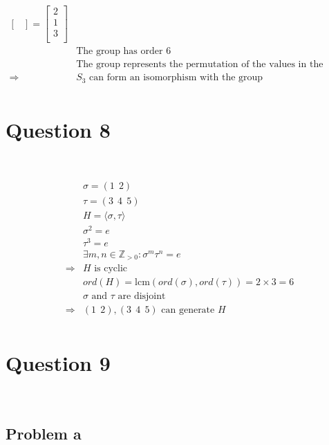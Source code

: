 \documentclass{article}
\begin{document}
\begin{equation*}
\begin{split}
\begin{bmatrix}
        \end{bmatrix}=\begin{bmatrix}
            2\\
            1\\
            3\\
        \end{bmatrix}\\
        &\text{The group has order }6\\
        &\text{The group represents the permutation of the values in the vector}\\
        \Rightarrow&S_3\text{ can form an isomorphism with the group}\\
    \end{split}
\end{equation*}

\newpage

\section*{Question 8}

~

\begin{equation*}
    \begin{split}
        &\sigma = (1\ \ 2)\\
        &\tau=(3\ \ 4\ \ 5)\\
        &H=\langle\sigma,\tau\rangle\\
        &\sigma^2=e\\
        &\tau^3=e\\
        &\exists m,n\in\mathbb{Z} _{>0}:\sigma^m\tau^n=e\\
        \Rightarrow&H\text{ is cyclic}\\
        &ord(H)=\mathrm{lcm}(ord(\sigma),ord(\tau))=2\times 3=6\\
        &\sigma\text{ and }\tau\text{ are disjoint}\\
        \Rightarrow&(1\ \ 2),(3\ \ 4\ \ 5)\text{ can generate } H\\
    \end{split}
\end{equation*}

\newpage

\section*{Question 9}

~

\subsection*{Problem a}
\end{document}
